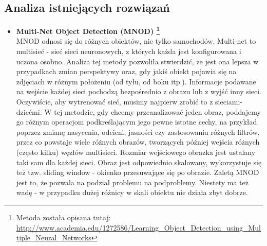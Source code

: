\documentclass{article}
\begin{document}
\subsection{Analiza istniejących rozwiązań}
\begin{itemize}
\item \textbf{Multi-Net Object Detection (MNOD) \footnote{Metoda została opisana tutaj: \scriptsize{\url{http://www.academia.edu/1272586/Learning_Object_Detection_using_Multiple_Neural_Networks}}}}\\[0.3cm]
 MNOD odnosi się do różnych obiektów, nie tylko samochodów. Multi-net to multisieć - sieć sieci neuronowych, z których każda jest konfigurowana i uczona osobno. Analiza tej metody pozwoliła stwierdzić, że jest ona lepsza w przypadkach zmian perspektywy oraz, gdy jakiś obiekt pojawia się na zdjęciach w różnym położeniu (od tyłu, od boku itp.). Informacje podawane na wejście każdej sieci pochodzą bezpośrednio z obrazu lub z wyjść inny sieci. Oczywiście, aby wytrenować sieć, musimy najpierw zrobić to z sieciami-dziećmi.  W tej metodzie, gdy chcemy przeanalizować jeden obraz, poddajemy go różnym operacjom podkreślającym jego pewne istotne cechy, na przykład poprzez zmianę nasycenia, odcieni, jasności czy zastosowaniu różnych filtrów, przez co powstaje wiele różnych obrazów, tworzących później wejścia różnych (często kilku) węzłów multisieci. Rozmiar wejściowego obrazka jest ustalany taki sam dla każdej sieci. Obraz jest odpowiednio skalowany, wykorzystuje się też tzw. sliding window - okienko przesuwające się po obrazie. Zaletą MNOD jest to, że pozwala na podział problemu na podproblemy. Niestety ma też wadę - w przypadku dużej różnicy w skali obiektu nie działa zbyt dobrze.


\end{itemize}
\end{document}
